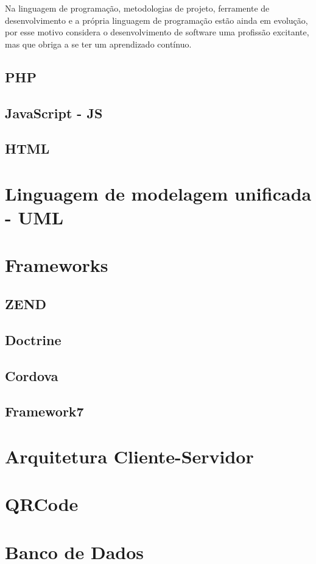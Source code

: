 Na linguagem de programação, metodologias de projeto, ferramente de desenvolvimento e a própria linguagem de programação estão ainda em evolução, por esse motivo \cite{sebesta2011} considera o desenvolvimento de software uma profissão excitante, mas que obriga a se ter um aprendizado contínuo.

\subsection{PHP}
\subsection{JavaScript - JS}
\subsection{HTML}

\section{ Linguagem de modelagem unificada - UML}

\section{Frameworks}
\subsection{ZEND}
\subsection{Doctrine}
\subsection{Cordova}
\subsection{Framework7}

\section{Arquitetura Cliente-Servidor}
\section{QRCode}

\section{Banco de Dados}